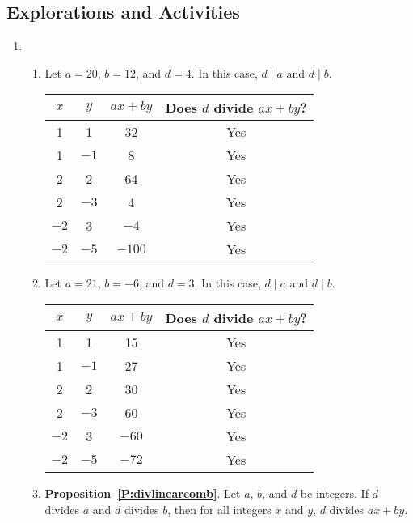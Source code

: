 \subsection*{Explorations and Activities}
\setcounter{oldenumi}{\theenumi}
\begin{enumerate} \setcounter{enumi}{\theoldenumi}
\item \begin{enumerate}
\item Let  $a = 20$, $b = 12$, and  $d = 4$.  In this case,  $d \mid a$ and $d \mid b$. 
\begin{center}
\begin{tabular}[t]{| c | c | c | c |} \hline
$x$  &  $y$  &  $ax + by$  &	Does  $d$  divide  $ax + by$? \\ \hline
1  &	1  &	32  &	Yes \\ \hline
1  &	$-1$ &	8   &	Yes \\ \hline
2  &	2  &	64  &	Yes \\ \hline
2  &	$-3$ &	4   &	Yes \\ \hline
$-2$ &	3  &	$-4$  &	Yes \\ \hline
$-2$ &	$-5$ &	$-100$ & Yes \\ \hline
\end{tabular}
\end{center}

\item Let  $a = 21$, $b =  - 6$, and  $d = 3$. In this case,  $d \mid a$ and $d \mid b$.
\begin{center}
\begin{tabular}[t]{| c | c | c | c |} \hline
$x$  &  $y$  &  $ax + by$  &	Does  $d$  divide  $ax + by$? \\ \hline
1  &	1  &	15  &	Yes \\ \hline
1  &	$-1$ &	27  &	Yes \\ \hline
2  &	2  &	30  &	Yes \\ \hline
2  &	$-3$ &	60   &	Yes \\ \hline
$-2$ &	3  &	$-60$  &	Yes \\ \hline
$-2$ &	$-5$ &	$-72$ & Yes \\ \hline
\end{tabular}
\end{center}

\item \textbf{Proposition~\ref{P:divlinearcomb}}.  Let $a$, $b$, and  $d$  be integers.  If  $d$  divides  $a$  and  $d$  divides  $b$, then for all integers  $x$  and  $y$,  $d$  divides  $ax + by$.


\end{enumerate}
\end{enumerate}
